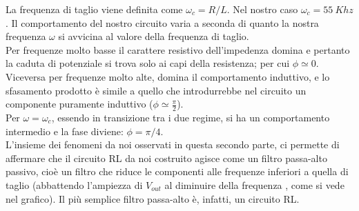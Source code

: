 La frequenza di taglio viene definita come $\omega_c = R/L$. Nel nostro caso $\omega_c = 55\ Khz$. Il comportamento del nostro circuito varia a seconda di quanto la nostra frequenza $\omega$ si avvicina al valore della frequenza di taglio. \\
Per frequenze molto basse il carattere resistivo dell'impedenza domina e pertanto la caduta di potenziale si trova solo ai capi della resistenza; per cui $ \phi \simeq 0$. Viceversa per frequenze molto alte, domina il comportamento induttivo, e lo sfasamento prodotto è simile a quello che introdurrebbe nel circuito un componente puramente induttivo ($\phi \simeq \frac{\pi}{2}$).  \\
Per $\omega = \omega_c$, essendo in transizione tra i due regime, si ha un comportamento intermedio e la fase diviene: $ \phi = \pi/4$. \\

L'insieme dei fenomeni da noi osservati in questa secondo parte, ci permette di affermare che il circuito RL da noi costruito agisce come un filtro passa-alto passivo, cioè un filtro che riduce le componenti alle frequenze inferiori a quella di taglio (abbattendo l'ampiezza di $V_{out}$ al diminuire della frequenza , come si vede nel grafico). Il più semplice filtro passa-alto è, infatti, un circuito RL. 
